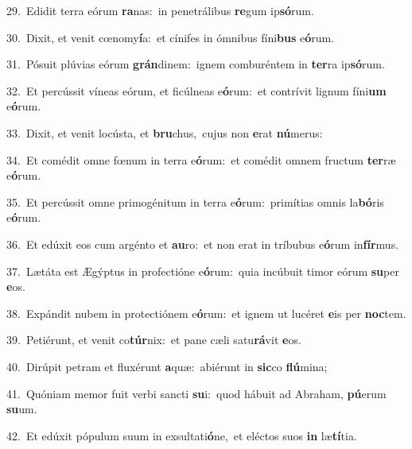 {\numbfont\textcolor{\numbcolor}{29.}}~Edidit terra eórum \textbf{ra}\-nas:~\star in penetrálibus \textbf{re}\-gum ip\-\textbf{só}\-rum.\par
{\numbfont\textcolor{\numbcolor}{30.}}~Dixit, et venit cœnomy\-\textbf{í}\-a:~\star et cínifes in ómnibus fíni\textbf{bus} e\-\textbf{ó}\-rum.\par
{\numbfont\textcolor{\numbcolor}{31.}}~Pósuit plúvias eórum \textbf{grán}\-dinem:~\star ignem comburéntem in \textbf{ter}\-ra ip\-\textbf{só}\-rum.\par
{\numbfont\textcolor{\numbcolor}{32.}}~Et percússit víneas eórum, et ficúlneas e\-\textbf{ó}\-rum:~\star et contrívit lignum fíni\textbf{um} e\-\textbf{ó}\-rum.\par
{\numbfont\textcolor{\numbcolor}{33.}}~Dixit, et venit locústa, et \textbf{bru}\-chus,~\star cujus non \textbf{e}\-rat \textbf{nú}\-merus:\par
{\numbfont\textcolor{\numbcolor}{34.}}~Et comédit omne fœnum in terra e\-\textbf{ó}\-rum:~\star et comédit omnem fructum \textbf{ter}\-ræ e\-\textbf{ó}\-rum.\par
{\numbfont\textcolor{\numbcolor}{35.}}~Et percússit omne primogénitum in terra e\-\textbf{ó}\-rum:~\star primítias omnis la\-\textbf{bó}\-ris e\-\textbf{ó}\-rum.\par
{\numbfont\textcolor{\numbcolor}{36.}}~Et edúxit eos cum argénto et \textbf{au}\-ro:~\star et non erat in tríbubus e\-\textbf{ó}\-rum in\-\textbf{fír}\-mus.\par
{\numbfont\textcolor{\numbcolor}{37.}}~Lætáta est Ægýptus in profectióne e\-\textbf{ó}\-rum:~\star quia incúbuit timor eórum \textbf{su}\-per \textbf{e}\-os.\par
{\numbfont\textcolor{\numbcolor}{38.}}~Expándit nubem in protectiónem e\-\textbf{ó}\-rum:~\star et ignem ut lucéret \textbf{e}\-is per \textbf{noc}\-tem.\par
{\numbfont\textcolor{\numbcolor}{39.}}~Petiérunt, et venit co\-\textbf{túr}\-nix:~\star et pane cæli satu\-\textbf{rá}\-vit \textbf{e}\-os.\par
{\numbfont\textcolor{\numbcolor}{40.}}~Dirúpit petram et fluxérunt \textbf{a}\-quæ:~\star abiérunt in \textbf{sic}\-co \textbf{flú}\-mina;\par
{\numbfont\textcolor{\numbcolor}{41.}}~Quóniam memor fuit verbi sancti \textbf{su}\-i:~\star quod hábuit ad Abraham, \textbf{pú}\-erum \textbf{su}\-um.\par
{\numbfont\textcolor{\numbcolor}{42.}}~Et edúxit pópulum suum in exsultati\-\textbf{ó}\-ne,~\star et eléctos suos \textbf{in} læ\-\textbf{tí}\-tia.\par
